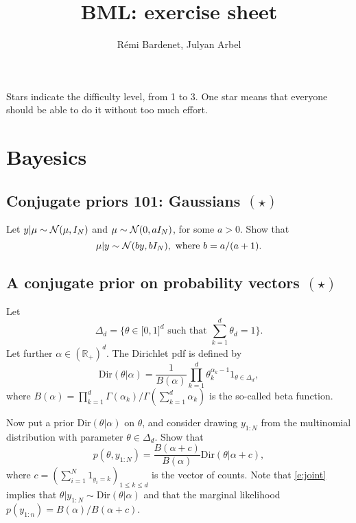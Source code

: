 \documentclass{article}
\title{BML: exercise sheet}
\date{}
\author{R\'emi Bardenet, Julyan Arbel}
\newif\ifsolutions
\newcommand\solution[1]{
\ifsolutions
\begin{mdframed}[style=MyFrame]
\textcolor{bleu}{\textbf{Solution:} #1}
\end{mdframed}
\fi
}
\begin{document}
\maketitle

Stars indicate the difficulty level, from 1 to 3. One star means that everyone should be able to do it without too much effort.

\tableofcontents

\section{Bayesics}

\subsection{Conjugate priors 101: Gaussians $(\star)$}
\label{s:gaussianConjugacy}
Let $y\vert\mu \sim \mathcal{N}(\mu,I_N)$ and $\mu\sim \mathcal{N}(0,a I_N)$, for some $a>0$. Show that
\begin{equation}
  \mu\vert y \sim \mathcal{N}(b y,bI_N), \text{ where } b=a/(a+1).
  \label{e:gaussianConjugacy}
\end{equation}

\solution{
We apply Bayes' theorem and keep track of only the terms that will not end up in the normalization constant of the posterior. This gives
\begin{align*}
  \log p(\mu\vert y) &\propto \log p(y\vert\mu) + \log p(\mu)\\
  &\propto - \frac{\Vert y-\mu\Vert^2}{2} - \frac{\Vert \mu\Vert^2}{2a}\\
  & \propto -\frac12 \Vert\mu\Vert^2\left(1+\frac1a \right) + y^T\mu\\
  & \propto - \frac{\Vert \mu - by\Vert^2}{2b}.
\end{align*}
}

\subsection{A conjugate prior on probability vectors $(\star)$}
Let
$$
\Delta_d = \{\theta\in\mathbb[0,1]^d \text{ such that } \sum_{k=1}^d \theta_d = 1\}.
$$
Let further $\alpha\in(\mathbb{R}_+)^d$. The Dirichlet pdf is defined by
 $$
 \text{Dir}(\theta\vert \alpha) = \frac{1}{B(\alpha)} \prod_{k=1}^d \theta_k^{\alpha_k -1} 1_{\theta\in \Delta_d},$$
where
 $ B(\alpha) = \prod_{k=1}^d \Gamma(\alpha_k) / \Gamma(\sum_{k=1}^d \alpha_k)$
 is the so-called beta function.

 Now put a prior $\text{Dir}(\theta\vert \alpha)$ on $\theta$, and consider drawing $y_{1:N}$ from the multinomial distribution with parameter $\theta\in\Delta_d$. Show that
 \begin{equation}
   p(\theta, y_{1:N}) = \frac{B(\alpha+c)}{B(\alpha)} \text{Dir}(\theta\vert \alpha + c),
\label{e:joint}
 \end{equation}
 where $c=(\sum_{i=1}^N 1_{y_i=k})_{1\leq k \leq d}$ is the vector of counts. Note that \eqref{e:joint} implies that $\theta\vert y_{1:N} \sim \text{Dir}(\theta\vert \alpha)$ and that the marginal likelihood $p(y_{1:n}) = B(\alpha)/B(\alpha+c)$.
\end{document}
